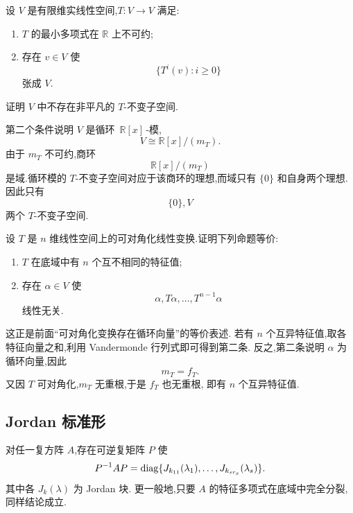 \begin{example}
设 $V$ 是有限维实线性空间,$T:V\to V$ 满足:
\begin{enumerate}
    \item $T$ 的最小多项式在 $\mathbb{R}$ 上不可约;
    \item 存在 $v\in V$ 使
    \[
    \{T^i(v):i\geq0\}
    \]
    张成 $V$.
\end{enumerate}
证明 $V$ 中不存在非平凡的 $T$-不变子空间.
\end{example}
\exampleblank

\begin{solution}
第二个条件说明 $V$ 是循环 $\,\mathbb{R}[x]\,$-模,
\[
V\cong \mathbb{R}[x]/(m_T).
\]
由于 $m_T$ 不可约,商环
\[
\mathbb{R}[x]/(m_T)
\]
是域.循环模的 $T$-不变子空间对应于该商环的理想,而域只有
$\{0\}$ 和自身两个理想.因此只有
\[
\boxed{\{0\},V}
\]
两个 $T$-不变子空间.
\end{solution}


\begin{example}
设 $T$ 是 $n$ 维线性空间上的可对角化线性变换.证明下列命题等价:
\begin{enumerate}
    \item $T$ 在底域中有 $n$ 个互不相同的特征值;
    \item 存在 $\alpha\in V$ 使
    \[
    \alpha,T\alpha,\ldots,T^{n-1}\alpha
    \]
    线性无关.
\end{enumerate}
\end{example}
\exampleblank

\begin{solution}
这正是前面``可对角化变换存在循环向量''的等价表述.
若有 $n$ 个互异特征值,取各特征向量之和,利用 Vandermonde 行列式即可得到第二条.
反之,第二条说明 $\alpha$ 为循环向量,因此
\[
m_T=f_T.
\]
又因 $T$ 可对角化,$m_T$ 无重根,于是 $f_T$ 也无重根,
即有 $n$ 个互异特征值.
\end{solution}


\subsection{Jordan 标准形}

\begin{theorem}
对任一复方阵 $A$,存在可逆复矩阵 $P$ 使
\[
P^{-1}AP
=
\operatorname{diag}\{J_{k_{11}}(\lambda_1),\ldots,J_{k_{sr_s}}(\lambda_s)\}.
\]
其中各 $J_k(\lambda)$ 为 Jordan 块.
更一般地,只要 $A$ 的特征多项式在底域中完全分裂,同样结论成立.
\end{theorem}

